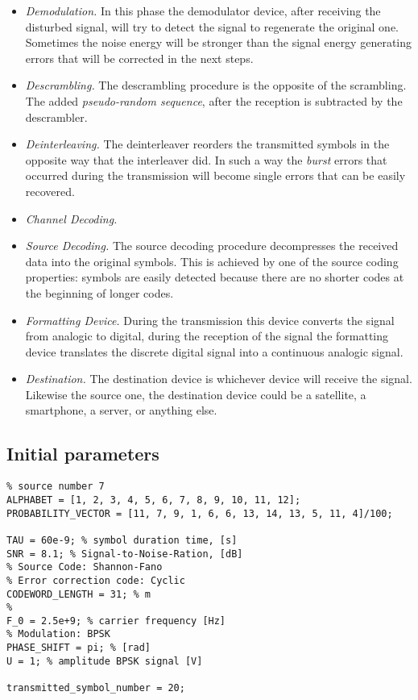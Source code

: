\begin{itemize}
    \item \textsl{Demodulation.} In this phase the demodulator device, after receiving the disturbed signal, will try to detect the signal to regenerate the original one. Sometimes the noise energy will be stronger than the signal energy generating errors that will be corrected in the next steps.
    \item \textsl{Descrambling.} The descrambling procedure is the opposite of the scrambling. The added \textit{pseudo-random sequence}, after the reception is subtracted by the descrambler.
    \item \textsl{Deinterleaving.} The deinterleaver reorders the transmitted symbols in the opposite way that the interleaver did. In such a way the \textit{burst} errors that occurred during the transmission will become single errors that can be easily recovered.
    \item \textsl{Channel Decoding.} 
    \item \textsl{Source Decoding.} The source decoding procedure decompresses the received data into the original symbols. This is achieved by one of the source coding properties: symbols are easily detected because there are no shorter codes at the beginning of longer codes.
    \item \textsl{Formatting Device.} During the transmission this device converts the signal from analogic to digital, during the reception of the signal the formatting device translates the discrete digital signal into a continuous analogic signal. 
    \item \textsl{Destination.} The destination device is whichever device will receive the signal. Likewise the source one, the destination device could be a satellite, a smartphone, a server, or anything else.
\end{itemize}

\subsection{Initial parameters}

\begin{lstlisting}
% source number 7
ALPHABET = [1, 2, 3, 4, 5, 6, 7, 8, 9, 10, 11, 12];
PROBABILITY_VECTOR = [11, 7, 9, 1, 6, 6, 13, 14, 13, 5, 11, 4]/100;

TAU = 60e-9; % symbol duration time, [s]
SNR = 8.1; % Signal-to-Noise-Ration, [dB]
% Source Code: Shannon-Fano
% Error correction code: Cyclic
CODEWORD_LENGTH = 31; % m
% 
F_0 = 2.5e+9; % carrier frequency [Hz]
% Modulation: BPSK
PHASE_SHIFT = pi; % [rad]
U = 1; % amplitude BPSK signal [V]

transmitted_symbol_number = 20;
\end{lstlisting}





\setcounter{secnumdepth}{1}

